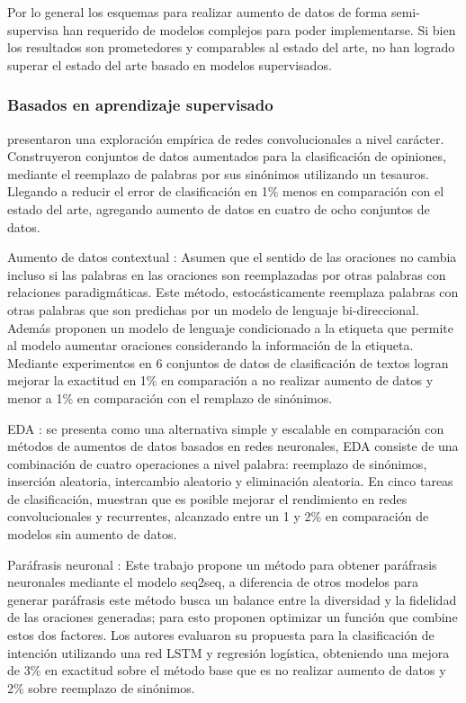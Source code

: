 Por lo general los esquemas para realizar aumento de datos de forma semi-supervisa han requerido de modelos complejos para poder implementarse. Si bien los resultados son prometedores y comparables al estado del arte, no han logrado superar el estado del arte basado en modelos supervisados.

\subsubsection{Basados en aprendizaje supervisado}

\citep{zhang2015character} presentaron una exploración empírica de redes convolucionales a nivel carácter. Construyeron conjuntos de datos aumentados para la clasificación de opiniones, mediante el reemplazo de palabras por sus sinónimos utilizando un tesauros. Llegando a reducir el error de clasificación en 1\% menos en comparación con el estado del arte, agregando aumento de datos en cuatro de ocho conjuntos de datos.


Aumento de datos contextual \citep{kobayashi2018contextual}: Asumen que el sentido de las oraciones no cambia incluso si las palabras en las oraciones son reemplazadas por otras palabras con relaciones paradigmáticas. Este método, estocásticamente reemplaza palabras con otras palabras que son predichas por un modelo de lenguaje bi-direccional. Además proponen un modelo de lenguaje condicionado a la etiqueta que permite al modelo aumentar oraciones considerando la información de la etiqueta. Mediante experimentos en 6 conjuntos de datos de clasificación de textos logran mejorar la exactitud en 1\% en comparación a no realizar aumento de datos y menor a 1\% en comparación con el remplazo de sinónimos.

EDA \citep{wei2019eda}: se presenta como una alternativa simple y escalable en comparación con métodos de aumentos de datos basados en redes neuronales, EDA consiste de una combinación de cuatro operaciones a nivel palabra: reemplazo de sinónimos, inserción aleatoria, intercambio aleatorio y eliminación aleatoria. En cinco tareas de clasificación, muestran que es posible mejorar  el rendimiento en redes convolucionales y recurrentes, alcanzado entre un 1 y 2\% en comparación de modelos sin aumento de datos.

Paráfrasis neuronal \citep{kumar2019submodular}: Este trabajo propone un método para obtener paráfrasis neuronales mediante el modelo seq2seq, a diferencia de otros modelos para generar paráfrasis este método busca un balance entre la diversidad y la fidelidad de las oraciones generadas; para esto proponen optimizar un función que combine estos dos factores. Los autores evaluaron su propuesta para la clasificación de intención utilizando una red LSTM y regresión logística, obteniendo una mejora de 3\% en exactitud sobre el método base que es no realizar aumento de datos y 2\% sobre reemplazo de sinónimos.

